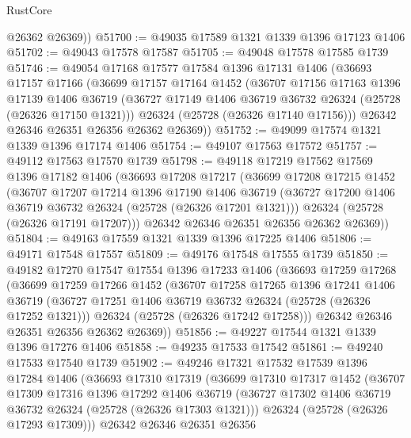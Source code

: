 \begin{lexlean}{RustCore}
\begin{coremodule}
        @26362
        @26369))
@51700 := @49035 @17589 @1321 @1339 @1396 @17123 @1406
@51702 := @49043 @17578 @17587
@51705 := @49048 @17578 @17585 @1739
@51746 := @49054
    @17168
    @17577
    @17584
    @1396
    @17131
    @1406
    (@36693
      @17157
      @17166
      (@36699
        @17157
        @17164
        @1452
        (@36707
          @17156
          @17163
          @1396
          @17139
          @1406
          @36719
          (@36727 @17149 @1406 @36719 @36732 @26324 (@25728 (@26326 @17150 @1321)))
          @26324
          (@25728 (@26326 @17140 @17156)))
        @26342
        @26346
        @26351
        @26356
        @26362
        @26369))
@51752 := @49099 @17574 @1321 @1339 @1396 @17174 @1406
@51754 := @49107 @17563 @17572
@51757 := @49112 @17563 @17570 @1739
@51798 := @49118
    @17219
    @17562
    @17569
    @1396
    @17182
    @1406
    (@36693
      @17208
      @17217
      (@36699
        @17208
        @17215
        @1452
        (@36707
          @17207
          @17214
          @1396
          @17190
          @1406
          @36719
          (@36727 @17200 @1406 @36719 @36732 @26324 (@25728 (@26326 @17201 @1321)))
          @26324
          (@25728 (@26326 @17191 @17207)))
        @26342
        @26346
        @26351
        @26356
        @26362
        @26369))
@51804 := @49163 @17559 @1321 @1339 @1396 @17225 @1406
@51806 := @49171 @17548 @17557
@51809 := @49176 @17548 @17555 @1739
@51850 := @49182
    @17270
    @17547
    @17554
    @1396
    @17233
    @1406
    (@36693
      @17259
      @17268
      (@36699
        @17259
        @17266
        @1452
        (@36707
          @17258
          @17265
          @1396
          @17241
          @1406
          @36719
          (@36727 @17251 @1406 @36719 @36732 @26324 (@25728 (@26326 @17252 @1321)))
          @26324
          (@25728 (@26326 @17242 @17258)))
        @26342
        @26346
        @26351
        @26356
        @26362
        @26369))
@51856 := @49227 @17544 @1321 @1339 @1396 @17276 @1406
@51858 := @49235 @17533 @17542
@51861 := @49240 @17533 @17540 @1739
@51902 := @49246
    @17321
    @17532
    @17539
    @1396
    @17284
    @1406
    (@36693
      @17310
      @17319
      (@36699
        @17310
        @17317
        @1452
        (@36707
          @17309
          @17316
          @1396
          @17292
          @1406
          @36719
          (@36727 @17302 @1406 @36719 @36732 @26324 (@25728 (@26326 @17303 @1321)))
          @26324
          (@25728 (@26326 @17293 @17309)))
        @26342
        @26346
        @26351
        @26356

\end{coremodule}
\end{lexlean}
